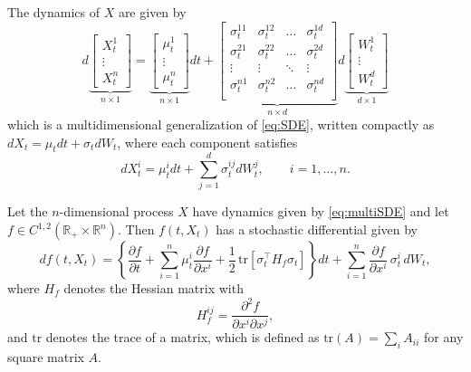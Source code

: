 
The dynamics of $X$ are given by
\begin{equation}
    d\underbrace{\begin{bmatrix}
    X_t^1\\ \vdots\\ X_t^n
    \end{bmatrix}}_{n\times 1}=
    \underbrace{\begin{bmatrix}
    \mu_t^1\\ \vdots\\ \mu_t^n
    \end{bmatrix}}_{n\times 1}dt+
    \underbrace{\begin{bmatrix}
    \sigma_t^{11} & \sigma_t^{12} & \dots & \sigma_t^{1d}\\
    \sigma_t^{21} & \sigma_t^{22} & \dots & \sigma_t^{2d}\\
    \vdots & \vdots & \ddots & \vdots\\
    \sigma_t^{n1} & \sigma_t^{n2} & \dots & \sigma_t^{nd}\\
    \end{bmatrix}}_{n\times d}
    d\underbrace{\begin{bmatrix}
    W^1_t\\ \vdots\\ W^d_t
    \end{bmatrix}}_{d\times 1}
\label{eq:multiSDE}
\end{equation}
which is a multidimensional generalization of \eqref{eq:SDE}, written compactly as $dX_t=\mu_tdt+\sigma_tdW_t$, where each component satisfies
$$dX_t^i=\mu^i_tdt+\sum_{j=1}^d\sigma^{ij}_tdW_t^j, \qquad i=1,\ldots,n.$$




\begin{theorem}
Let the $n$-dimensional process $X$ have dynamics given by \eqref{eq:multiSDE} and let $f \in C^{1,2}(\mathbb{R}_+ \times \mathbb{R}^n)$. Then $f(t,X_t)$ has a stochastic differential given by
\begin{equation}
    df(t,X_t) = \left\{
        \frac{\partial f}{\partial t}
        + \sum_{i=1}^n \mu_t^i \frac{\partial f}{\partial x^i}
        + \frac{1}{2}\,\mathrm{tr}\!\left[\sigma_t^\top H_f \sigma_t\right]
    \right\}dt
    + \sum_{i=1}^n \frac{\partial f}{\partial x^i}\,\sigma_t^i\,dW_t,
    \label{eq:Ito}
\end{equation}
where $H_f$ denotes the Hessian matrix with
$$H_f^{ij}=\frac{\partial^2f}{\partial {x^i}\partial {x^j}},$$
and $\text{tr}$ denotes the trace of a matrix, which is defined as $\text{tr}(A)=\sum_i A_{ii}$ for any square matrix $A$.
\label{thm:ito}
\end{theorem}

